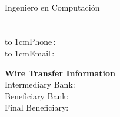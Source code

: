 \documentclass[a4paper]{article}
\def\footnotestyle#1{%
  {\textsf{\color{footnotegray}\fontsize{3mm}{0mm}\selectfont #1}}%
}
\begin{document}
\small

\setlength{\columnsep}{1.5cm}
\begin{multicols}{2}
\noindent\companyname{}\\
Ingeniero en Computaci\'{o}n\\
\companystreet{}\\
\companycity{}\\
\hbox to 1cm{Phone\,:\hss} \companytel\\
\hbox to 1cm{Email\,:\hss} \companyemail\\
\end{multicols}

\footnotestyle{\textbf{Wire Transfer Information}\\
  Intermediary Bank: \intermediarybank\\
  Beneficiary Bank: \beneficiarybank\\
  Final Beneficiary: \finalbeneficiary}
\end{document}
